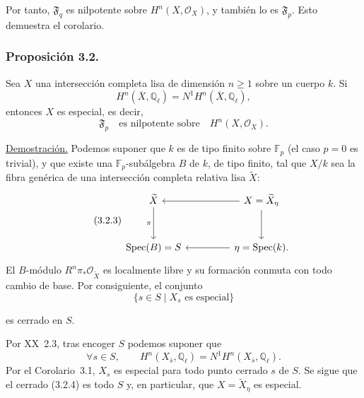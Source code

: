 \pageoriginale

Por tanto, $\mathfrak F_q$ es nilpotente sobre $H^n(X,\mathcal O_X)$, y
también lo es $\mathfrak F_p$. Esto demuestra el corolario.

\subsubsection*{Proposición 3.2.}
Sea $X$ una intersección completa lisa de dimensión $n\geq1$ sobre un
cuerpo $k$. Si
\begin{equation}\tag{3.2.1}
H^n(\overline X,\mathbb Q_\ell)=N^1H^n(\overline X,\mathbb Q_\ell),
\end{equation}
entonces $X$ es especial, es decir,
\begin{equation}\tag{3.2.2}
\mathfrak F_p\quad\text{es nilpotente sobre}\quad H^n(X,\mathcal O_X).
\end{equation}

\noindent\underline{Demostración.}
Podemos suponer que $k$ es de tipo finito sobre $\mathbb F_p$ (el caso
$p=0$ es trivial), y que existe una $\mathbb F_p$-subálgebra $B$ de $k$,
de tipo finito, tal que $X/k$ sea la fibra genérica de una intersección
completa relativa lisa $\widetilde X$:
\begin{equation}\tag{3.2.3}
\begin{tikzcd}[column sep=4.5em,row sep=3em]
\widetilde X \arrow[d,"\pi"'] &
X=\sisi{\widetilde X/_{\eta}}{\widetilde X_\eta}
 \arrow[l]\arrow[d] \\
\operatorname{Spec}(B)=S & \eta=\operatorname{Spec}(k)\arrow[l].
\end{tikzcd}
\end{equation}
El $B$-módulo $R^n\pi_*\mathcal O_{\widetilde X}$ es localmente libre y
su formación conmuta con todo cambio de base. Por consiguiente, el conjunto
\begin{equation}\tag{3.2.4}
\{s\in S\mid X_s\text{ es especial}\}
\end{equation}

\pageoriginale

es cerrado en $S$.

Por XX~2.3, tras encoger $S$ podemos suponer que
\begin{equation}\tag{3.2.5}
\forall s\in S,\qquad
H^n(X_{\bar s},\mathbb Q_\ell)=N^1H^n(X_{\bar s},\mathbb Q_\ell).
\end{equation}
Por el Corolario~3.1, $X_s$ es especial para todo punto cerrado $s$ de
$S$. Se sigue que el cerrado (3.2.4) es todo $S$ y, en particular, que
$X=\widetilde X_\eta$ es especial.

